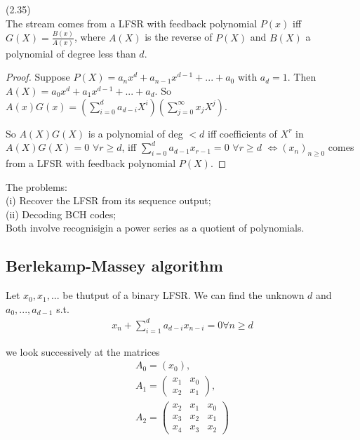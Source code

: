 \documentclass[a4paper]{article}
\begin{document}
\begin{thm} (2.35)\\
The stream comes from a LFSR with feedback polynomial $P(x)$ iff $G(X) = \frac{B(x)}{A(x)}$, where $A(X)$ is the reverse of $P(X)$ and $B(X)$ a polynomial of degree less than $d$.
\begin{proof}
Suppose $P(X) = a_n x^d + a_{n-1} x^{d-1} + ... + a_0$ with $a_d = 1$. Then $A(X) = a_0 x^d + a_1 x^{d-1} + ... + a_d$. So $A(x)G(x) = (\sum_{i=0}^d a_{d-i}X^i)(\sum_{j=0}^\infty x_j X^j)$.

So $A(X)G(X)$ is a polynomial of deg $<d$ iff coefficients of $X^r$ in $A(X)G(X) = 0$ $\forall r \geq d$, iff $\sum_{i=0}^d a_{d-1} x_{r-1} = 0$ $\forall r \geq d$ $\iff (x_n)_{n \geq 0}$ comes from a LFSR with feedback polynomial $P(X)$.
\end{proof}
\end{thm}

\begin{rem}
The problems:\\
(i) Recover the LFSR from its sequence output;\\
(ii) Decoding BCH codes;\\
Both involve recognisigin a power series as a quotient of polynomials.
\end{rem}

\subsection{Berlekamp-Massey algorithm}
Let $x_0,x_1,...$ be thutput of a binary LFSR. We can find the unknown $d$ and $a_0,...,a_{d-1}$ s.t.
\begin{equation*}
\begin{aligned}
x_n + \sum_{i=1}^d a_{d-i} x_{n-i} = 0 \forall n \geq d
\end{aligned}
\end{equation*}

we look successively at the matrices
\begin{equation*}
\begin{aligned}
A_0 = (x_0),\\
A_1 = \begin{pmatrix}
x_1 & x_0\\
x_2 & x_1
\end{pmatrix},\\
A_2 =\begin{pmatrix}
x_2 & x_1 & x_0\\
x_3 & x_2 & x_1\\
x_4 & x_3 & x_2
\end{pmatrix}
\end{aligned}
\end{equation*}
\end{document}
